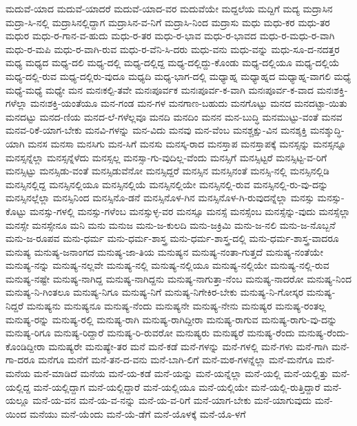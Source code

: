 {ಮದುವೆ-ಯಾದ
ಮದುವೆ-ಯಾದರೆ
ಮದುವೆ-ಯಾದ-ವರ
ಮದುವೆಯೇ
ಮದ್ದಲೆಯ
ಮದ್ದಿಗೆ
ಮದ್ಯ
ಮದ್ರಾಸಿನ
ಮದ್ರಾ-ಸಿ-ನಲ್ಲಿ
ಮದ್ರಾಸಿನಲ್ಲಿದ್ದಾಗ
ಮದ್ರಾಸಿನ-ವ-ನಿಗೆ
ಮದ್ರಾಸಿ-ನಿಂದ
ಮದ್ರಾಸು
ಮಧು
ಮಧು-ಕರ
ಮಧು-ತರ
ಮಧುರ
ಮಧು-ರ-ಗಾನ-ವ-ಹುದು
ಮಧು-ರ-ತರ
ಮಧು-ರ-ಭಾವ
ಮಧು-ರ-ಭಾವದ
ಮಧು-ರ-ಮಧು-ರ-ವಾಗಿ
ಮಧು-ರ-ಮಪಿ
ಮಧು-ರ-ವಾಗಿ-ರುವ
ಮಧು-ರ-ವೆನಿ-ಸಿ-ದರು
ಮಧು-ವನು
ಮಧು-ವನ್ನು
ಮಧು-ಸೂ-ದ-ನದತ್ತರ
ಮಧ್ಯ
ಮಧ್ಯದ
ಮಧ್ಯ-ದಲಿ
ಮಧ್ಯ-ದಲ್ಲಿ
ಮಧ್ಯ-ದಲ್ಲಿದ್ದ
ಮಧ್ಯ-ದಲ್ಲಿದ್ದು-ಕೊಂಡು
ಮಧ್ಯ-ದಲ್ಲಿಯೂ
ಮಧ್ಯ-ದಲ್ಲಿಯೆ
ಮಧ್ಯ-ದಲ್ಲಿ-ರುವ
ಮಧ್ಯ-ದಲ್ಲಿರು-ವುದೂ
ಮಧ್ಯದಿ
ಮಧ್ಯ-ಭಾಗ-ದಲ್ಲಿ
ಮಧ್ಯಾಹ್ನ
ಮಧ್ಯಾಹ್ನದ
ಮಧ್ಯಾಹ್ನ-ವಾಗಲಿ
ಮಧ್ಯೆ
ಮಧ್ಯೆ-ಮಧ್ಯೆ
ಮಧ್ಯೇ
ಮನ
ಮನಃಕಲ್ಪಿ-ತವೇ
ಮನಃಪೂರ್ವಕ
ಮನಃಪೂರ್ವ-ಕ-ವಾಗಿ
ಮನಃಪೂರ್ವ-ಕ-ವಾದ
ಮನಃಶಕ್ತಿ-ಗಳೆಲ್ಲಾ
ಮನಃಶಕ್ತಿ-ಯಂತೆಯೂ
ಮನ-ಗಂಡ
ಮನ-ಗಳ
ಮನಗಾಣ-ಬಹುದು
ಮನಗೊಟ್ಟು
ಮನದ
ಮನದಟ್ಟಾ-ಯಿತು
ಮನದಟ್ಟು
ಮನದ-ಣಿಯ
ಮನದ-ಲೆ-ಗಳೆಲ್ಲವೂ
ಮನದಿ
ಮನದಿಂ
ಮನನ
ಮನ-ಬುದ್ಧಿ
ಮನಮುಟ್ಟು-ವಂತೆ
ಮನವ
ಮನವ-ರಿಕೆ-ಯಾಗ-ಬೇಕು
ಮನವಿ-ಗಳನ್ನು
ಮನ-ವಿದು
ಮನವು
ಮನ-ವೆಂಬ
ಮನಶ್ಚಕ್ಷು-ವಿನ
ಮನಶ್ಶಕ್ತಿ
ಮನಶ್ಶುದ್ಧಿ-ಯಾಗಿ
ಮನಸ
ಮನಸಾ
ಮನಸಿಗು
ಮನ-ಸಿಗೆ
ಮನಸು
ಮನಸ್ಕ-ರಾದ
ಮನಸ್ತಾಪ
ಮನಸ್ತಾಪಕ್ಕೆ
ಮನಸ್ಸನ್ನು
ಮನಸ್ಸನ್ನೂ
ಮನಸ್ಸನ್ನೆಲ್ಲಾ
ಮನಸ್ಸನ್ನೆಳೆದು
ಮನಸ್ಸಲ್ಲ
ಮನಸ್ಸಾ-ಗು-ವುದಿಲ್ಲ-ವೆಂದು
ಮನಸ್ಸಿಗೆ
ಮನಸ್ಸಿಟ್ಟರೆ
ಮನಸ್ಸಿಟ್ಟ-ವ-ರಿಗೆ
ಮನಸ್ಸಿಟ್ಟು
ಮನಸ್ಸಿಡು-ವಂತೆ
ಮನಸ್ಸಿಡುವೆನೋ
ಮನಸ್ಸಿದ್ದರೆ
ಮನಸ್ಸಿನ
ಮನಸ್ಸಿನಂತೆ
ಮನಸ್ಸಿ-ನಲ್ಲಿ
ಮನಸ್ಸಿನಲ್ಲಿಡಿ
ಮನಸ್ಸಿನಲ್ಲಿದ್ದ
ಮನಸ್ಸಿನಲ್ಲಿಯೂ
ಮನಸ್ಸಿನಲ್ಲಿಯೆ
ಮನಸ್ಸಿನಲ್ಲಿಯೇ
ಮನಸ್ಸಿನಲ್ಲಿ-ರುವ
ಮನಸ್ಸಿನಲ್ಲಿ-ರು-ವು-ದನ್ನು
ಮನಸ್ಸಿನಲ್ಲೆಲ್ಲಾ
ಮನಸ್ಸಿನಿಂದ
ಮನಸ್ಸಿನೊ-ಡನೆ
ಮನಸ್ಸಿನೊಳ-ಗಿನ
ಮನಸ್ಸಿನೊಳ-ಗಿ-ರುವುದನ್ನೆಲ್ಲಾ
ಮನಸ್ಸು
ಮನಸ್ಸು-ಕೊಟ್ಟು
ಮನಸ್ಸು-ಗಳಲ್ಲಿ
ಮನಸ್ಸು-ಗಳೆಂಬ
ಮನಸ್ಸುಳ್ಳ-ವರ
ಮನಸ್ಸೂ
ಮನಸ್ಸೆ
ಮನಸ್ಸೆಂಬ
ಮನಸ್ಸೆನ್ನು-ವುದು
ಮನಸ್ಸೆಲ್ಲಾ
ಮನಸ್ಸೇ
ಮನಸ್ಸೇನೂ
ಮನಿ
ಮನು
ಮನುಜ
ಮನು-ಜ-ಕುಲದಿ
ಮನು-ಜಕ್ರಿಮಿ
ಮನು-ಜ-ನಲಿ
ಮನು-ಜ-ನೊಬ್ಬನೆ
ಮನು-ಜ-ರೂಪವ
ಮನು-ಧರ್ಮ
ಮನು-ಧರ್ಮ-ಶಾಸ್ತ್ರ
ಮನು-ಧರ್ಮ-ಶಾಸ್ತ್ರ-ದಲ್ಲಿ
ಮನು-ಧರ್ಮ-ಶಾಸ್ತ್ರ-ವಾದರೂ
ಮನುಷ್ಯ
ಮನುಷ್ಯ-ಜನಾಂಗದ
ಮನುಷ್ಯ-ಜಾ-ತಿಯ
ಮನುಷ್ಯನ
ಮನುಷ್ಯ-ನಂತಾ-ಗುತ್ತದೆ
ಮನುಷ್ಯ-ನಂತೆಯೇ
ಮನುಷ್ಯ-ನನ್ನು
ಮನುಷ್ಯ-ನಲ್ಲವೇ
ಮನುಷ್ಯ-ನಲ್ಲಿ
ಮನುಷ್ಯ-ನಲ್ಲಿಯೂ
ಮನುಷ್ಯ-ನಲ್ಲಿಯೇ
ಮನುಷ್ಯ-ನಲ್ಲಿ-ರುವ
ಮನುಷ್ಯ-ನಷ್ಟೇ
ಮನುಷ್ಯ-ನಾಗಿದ್ದ
ಮನುಷ್ಯ-ನಾಗಿದ್ದನು
ಮನುಷ್ಯ-ನಾಗುತ್ತಾ-ನೆಂಬ
ಮನುಷ್ಯ-ನಾದರೋ
ಮನುಷ್ಯ-ನಿಂದ
ಮನುಷ್ಯ-ನಿ-ಗಿಂತಲೂ
ಮನುಷ್ಯ-ನಿಗೂ
ಮನುಷ್ಯ-ನಿಗೆ
ಮನುಷ್ಯ-ನಿಗೇಕಿರ-ಬೇಕು
ಮನುಷ್ಯ-ನಿ-ಗೋಸ್ಕರ
ಮನುಷ್ಯ-ನಿದ್ದರೆ
ಮನುಷ್ಯನು
ಮನುಷ್ಯನೂ
ಮನುಷ್ಯ-ನೆಂದು
ಮನುಷ್ಯನೇ
ಮನುಷ್ಯ-ನೇನು
ಮನುಷ್ಯರ
ಮನುಷ್ಯ-ರಂತಲ್ಲ
ಮನುಷ್ಯ-ರನ್ನು
ಮನುಷ್ಯ-ರಲ್ಲಿ
ಮನುಷ್ಯ-ರಾಗಿ
ಮನುಷ್ಯ-ರಾಗಿದ್ದೀರಾ
ಮನುಷ್ಯ-ರಾಗುವ
ಮನುಷ್ಯ-ರಾಗು-ವು-ದನ್ನು
ಮನುಷ್ಯ-ರಿಗೂ
ಮನುಷ್ಯ-ರಿದ್ದಾರೆ
ಮನುಷ್ಯ-ರಿ-ರುವರೋ
ಮನುಷ್ಯರು
ಮನುಷ್ಯರೆ
ಮನುಷ್ಯ-ರೆಂದು
ಮನುಷ್ಯ-ರೆಂದು-ಕೊಂಡಿದ್ದೀರಾ
ಮನುಷ್ಯರೇ
ಮನುಷ್ಯೇ-ತರ
ಮನೆ
ಮನೆ-ಕಡೆ
ಮನೆ-ಗಳನ್ನು
ಮನೆ-ಗಳಲ್ಲಿ
ಮನೆ-ಗಳು
ಮನೆ-ಗಾಗಿ
ಮನೆ-ಗಾ-ದರೂ
ಮನೆಗೂ
ಮನೆಗೆ
ಮನೆ-ತನ-ದ-ವನು
ಮನೆ-ಬಾಗಿ-ಲಿಗೆ
ಮನೆ-ಮಠ-ಗಳನ್ನೆಲ್ಲಾ
ಮನೆ-ಮನೆಗೂ
ಮನೆ-ಮನೆಯ
ಮನೆ-ಮಾಡಿದೆ
ಮನೆಯ
ಮನೆ-ಯ-ಕಡೆ
ಮನೆ-ಯನ್ನು
ಮನೆ-ಯನ್ನೆಲ್ಲಾ
ಮನೆ-ಯಲ್ಲಿ
ಮನೆ-ಯಲ್ಲಿತ್ತು
ಮನೆ-ಯಲ್ಲಿದ್ದ
ಮನೆ-ಯಲ್ಲಿದ್ದಾಗ
ಮನೆ-ಯಲ್ಲಿದ್ದಾರೆ
ಮನೆ-ಯಲ್ಲಿಯೂ
ಮನೆ-ಯಲ್ಲಿಯೇ
ಮನೆ-ಯಲ್ಲಿ-ರುತ್ತಿದ್ದಾರೆ
ಮನೆ-ಯಲ್ಲೂ
ಮನೆ-ಯ-ವನ
ಮನೆ-ಯ-ವ-ನನ್ನು
ಮನೆ-ಯ-ವ-ರಿಗೆ
ಮನೆ-ಯಾಗ-ಬೇಕು
ಮನೆ-ಯಾಗುವುದು
ಮನೆ-ಯಿಂದ
ಮನೆಯು
ಮನೆ-ಯೆಂದು
ಮನೆ-ಯೆ-ಡೆಗೆ
ಮನೆ-ಯೊಳಕ್ಕೆ
ಮನೆ-ಯೊ-ಳಗೆ
}
